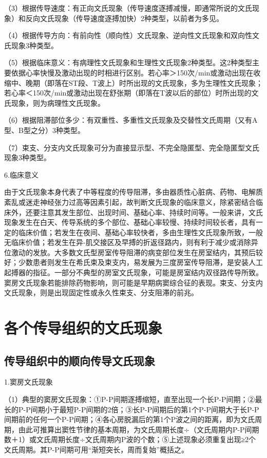 （3）根据传导速度：有正向文氏现象（传导速度逐搏减慢，即通常所说的文氏现象）和反向文氏现象（传导速度逐搏加快）2种类型，以前者为多见。

（4）根据传导方向：有前向性（顺向性）文氏现象、逆向性文氏现象和双向性文氏现象3种类型。

（5）根据临床意义：有病理性文氏现象和生理性文氏现象2种类型。这2种类型主要依据心率快慢及激动出现的时相进行区别。若心率＞150次/min或激动出现在收缩中、晚期（即落在ST段、T波上）时所出现的文氏现象，多为生理性文氏现象；若心率＜150次/min或激动出现在舒张期（即落在T波以后的部位）时所出现的文氏现象，则为病理性文氏现象。

（6）根据阻滞部位多少：有双重性、多重性文氏现象及交替性文氏周期（又有A型、B型之分）3种类型。

（7）束支、分支内文氏现象可分为直接显示型、不完全隐匿型、完全隐匿型文氏现象3种类型。

6.临床意义

由于文氏现象本身代表了中等程度的传导阻滞，多由器质性心脏病、药物、电解质紊乱或迷走神经张力过高等因素引起，故判断文氏现象的临床意义，除紧密结合临床外，还要注意其发生部位、出现时间、基础心率、持续时间等。一般来讲，文氏现象发生在白天、传导系统的多个部位、基础心率较慢、持续时间较长者，具有一定的临床价值；若发生在夜间、基础心率较快者，多由生理性文氏现象所致，一般无临床价值；若发生在异-肌交接区及早搏的折返径路内，则有利于减少或消除异位激动的发放。大多数文氏型房室传导阻滞的病变部位发生在房室结内，其预后较好；少数患者则发生在希氏束及束支内，易发展为三度房室传导阻滞，是安装人工起搏器的指征。一部分不典型的房室文氏现象，可能是房室结内双径路传导所致。窦房文氏现象若能排除药物影响，则可能是早期病窦综合征的表现。束支、分支内文氏现象，则是出现固定性或永久性束支、分支阻滞的前兆。

\protect\hypertarget{text00025.htmlux5cux23subid307}{}{}

\section{各个传导组织的文氏现象}

\protect\hypertarget{text00025.htmlux5cux23subid308}{}{}

\subsection{传导组织中的顺向传导文氏现象}

1.窦房文氏现象

（1）典型的窦房文氏现象：①P-P间期逐搏缩短，直至出现一个长P-P间期；②最长的P-P间期小于最短P-P间期的2倍；③长P-P间期后的第1个P-P间期大于长P-P间期前的任何一个P-P间期；④各心房脱漏后的第1个P波之间的距离，即为文氏周期，由此可推算出窦性节律的基本周期，为文氏周期长度÷（文氏周期内P-P间期数＋1）或文氏周期长度÷文氏周期内P波的个数；⑤上述现象必须重复出现≥2个文氏周期。其P-P间期可用“渐短突长，周而复始”概括之。

